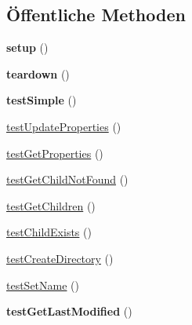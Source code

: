 \subsection*{Öffentliche Methoden}
\begin{DoxyCompactItemize}
\item 
\mbox{\label{class_sabre_1_1_cal_d_a_v_1_1_calendar_test_a723b864938184f2f3261a1cb0ee90cf7}} 
{\bfseries setup} ()
\item 
\mbox{\label{class_sabre_1_1_cal_d_a_v_1_1_calendar_test_aa7f6e1e90772c71e5267cfa1c63d599b}} 
{\bfseries teardown} ()
\item 
\mbox{\label{class_sabre_1_1_cal_d_a_v_1_1_calendar_test_a079aef74a5f56d6fddd2f0e2227fb109}} 
{\bfseries test\+Simple} ()
\item 
\mbox{\hyperlink{class_sabre_1_1_cal_d_a_v_1_1_calendar_test_a2704a311de4416b070ac628564d47245}{test\+Update\+Properties}} ()
\item 
\mbox{\hyperlink{class_sabre_1_1_cal_d_a_v_1_1_calendar_test_af573009eec342349304b8e381eb20567}{test\+Get\+Properties}} ()
\item 
\mbox{\hyperlink{class_sabre_1_1_cal_d_a_v_1_1_calendar_test_add0e888b9ce74c1646a99677fa8da9a5}{test\+Get\+Child\+Not\+Found}} ()
\item 
\mbox{\hyperlink{class_sabre_1_1_cal_d_a_v_1_1_calendar_test_a088134f6c2682674d9fe08d5f92a4852}{test\+Get\+Children}} ()
\item 
\mbox{\hyperlink{class_sabre_1_1_cal_d_a_v_1_1_calendar_test_a9d4fd54fc70f2a2fe8b53240de49e7f9}{test\+Child\+Exists}} ()
\item 
\mbox{\hyperlink{class_sabre_1_1_cal_d_a_v_1_1_calendar_test_af07c5856d13eb4e8926a92ab84fac4b1}{test\+Create\+Directory}} ()
\item 
\mbox{\hyperlink{class_sabre_1_1_cal_d_a_v_1_1_calendar_test_a6c92f4ad5c3e50c73c72883eca157fd7}{test\+Set\+Name}} ()
\item 
\mbox{\label{class_sabre_1_1_cal_d_a_v_1_1_calendar_test_ad0cd72569ce87d3cb800a4b6aac60d9a}} 
{\bfseries test\+Get\+Last\+Modified} ()
\item 
\mbox{\label{class_sabre_1_1_cal_d_a_v_1_1_calendar_test_a1888c2ea918cfe9379d510acb0347f69}} 

\end{DoxyCompactItemize}
